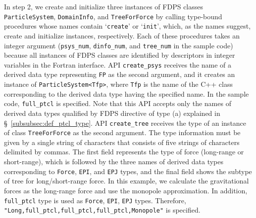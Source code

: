 \documentclass[twocolumn,useamsfonts]{pasj01}
\begin{document}
In step 2, we create and initialize three instances of FDPS classes \texttt{ParticleSystem}, \texttt{DomainInfo}, and \texttt{TreeForForce} by calling type-bound procedures whose names contain `\texttt{create}' or `\texttt{init}', which, as the names suggest, create and initialize instances, respectively. Each of these procedures takes an integer argument (\texttt{psys\_num}, \texttt{dinfo\_num}, and \texttt{tree\_num} in the sample code) because all instances of FDPS classes are identified by descriptors in integer variables in the Fortran interface. API \texttt{create\_psys} receives the name of a derived data type representing \texttt{FP} as the second argument, and it creates an instance of \texttt{ParticleSystem<Tfp>}, where \texttt{Tfp} is the name of the C++ class corresponding to the derived data type having the specified name. In the sample code, \texttt{full\_ptcl} is specified. Note that this API accepts only the names of derived data types qualified by FDPS directive of type (a) explained in \S~\ref{subsubsec:def_ptcl_type}. API \texttt{create\_tree} receives the type of an instance of class \texttt{TreeForForce} as the second argument. The type information must be given by a single string of characters that consists of five strings of characters delimited by commas. The first field represents the type of force (long-range or short-range), which is followed by the three names of derived data types corresponding to \texttt{Force}, \texttt{EPI}, and \texttt{EPJ} types, and the final field shows the subtype of tree for long/short-range force. In this example, we calculate the gravitational forces as the long-range force and use the monopole approximation. In addition, \texttt{full\_ptcl} type is used as \texttt{Force}, \texttt{EPI}, \texttt{EPJ} types. Therefore, \texttt{"Long,full\_ptcl,full\_ptcl,full\_ptcl,Monopole"} is specified.
\end{document}
